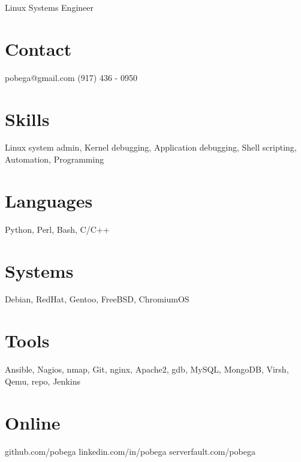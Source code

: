 \documentclass[]{resume}
\begin{document}
\graphicspath{ {images/} }

       {Linux Systems Engineer}


\begin{aside}
  \section{Contact}
    pobega@gmail.com
    (917) 436 - 0950
  \section{Skills}
    Linux system admin, 
    Kernel debugging,
    Application debugging,
    Shell scripting, Automation, Programming
  \section{Languages}
    Python, Perl, Bash,
    C/C++
  \section{Systems}
    Debian, RedHat, Gentoo,
    FreeBSD, ChromiumOS
  \section{Tools}
	Ansible, Nagios, nmap, Git, nginx, Apache2, gdb, MySQL, MongoDB, Virsh, Qemu, repo, Jenkins
  \section{Online}
    github.com/{\bodyfontbold pobega}
    linkedin.com/in/{\bodyfontbold pobega}
    serverfault.com/{\bodyfontbold pobega}
\end{aside}
\end{document}
